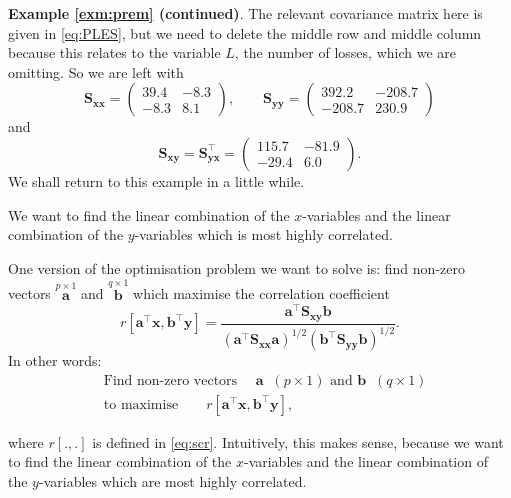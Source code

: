 \documentclass[]{book}
\theoremstyle{definition}
\theoremstyle{definition}
\theoremstyle{definition}
\theoremstyle{remark}
\begin{document}
\textbf{Example \ref{exm:prem} (continued)}. The relevant covariance matrix here is given in \eqref{eq:PLES},
but we need to delete the middle row and middle column because this relates to the variable \(L\), the number of losses,
which we are omitting. So we are left with
\begin{equation}
\boldsymbol S_{\boldsymbol x\boldsymbol x}=\begin{pmatrix} 39.4 & -8.3\\ -8.3 & 8.1   \end{pmatrix} , \qquad
\boldsymbol S_{\boldsymbol y\boldsymbol y}=\begin{pmatrix} 392.2 & -208.7\\ -208.7 & 230.9   \end{pmatrix}
\label{eq:bSxy1}
\end{equation}
and
\begin{equation}
\boldsymbol S_{\boldsymbol x\boldsymbol y}=\boldsymbol S_{\boldsymbol y\boldsymbol x}^\top =
\begin{pmatrix} 115.7  & -81.9\\ -29.4 & 6.0   \end{pmatrix}.
\label{eq:bSxy2}
\end{equation}
We shall return to this example in a little while.

We want to find the linear combination of the \(x\)-variables and the linear combination of the \(y\)-variables which is most highly correlated.

One version of the optimisation problem we want to solve is: find non-zero vectors \(\stackrel{p \times 1}{\boldsymbol a}\) and \(\stackrel{q \times 1}{\boldsymbol b}\) which maximise the correlation coefficient
\[
r[\boldsymbol a^\top \boldsymbol x,\boldsymbol b^\top \boldsymbol y]=\frac{\boldsymbol a^\top \boldsymbol S_{\boldsymbol x\boldsymbol y}\boldsymbol b}{(\boldsymbol a^\top \boldsymbol S_{\boldsymbol x\boldsymbol x}\boldsymbol a)^{1/2}(\boldsymbol b^\top \boldsymbol S_{\boldsymbol y\boldsymbol y}\boldsymbol b)^{1/2}}.
\]
In other words:
\begin{align}
  &\mbox{Find non-zero vectors }\quad  \boldsymbol a\;\; (p \times 1)\mbox{ and  } \boldsymbol b\;\; (q \times 1) \nonumber\\
  &\mbox{to maximise} \qquad  r[\boldsymbol a^\top \boldsymbol x,\boldsymbol b^\top \boldsymbol y],
\label{eq:opt26}
\end{align}

where \(r[.,.]\) is defined in \eqref{eq:scr}.
Intuitively, this makes sense, because we want to find the linear combination of the \(x\)-variables and the linear combination of the \(y\)-variables which are most highly correlated.
\end{document}
